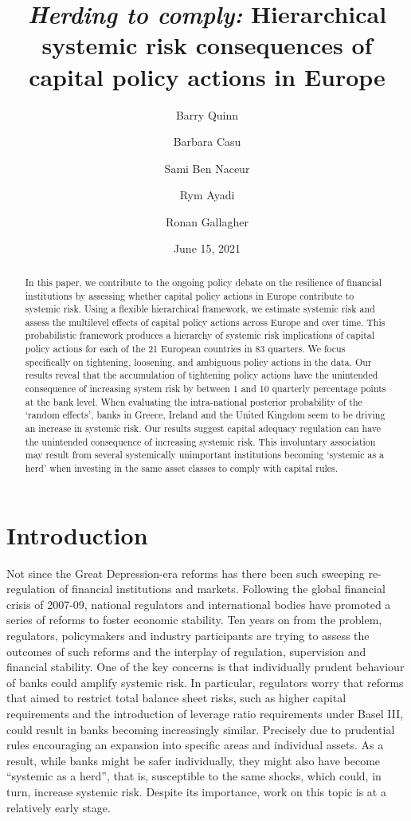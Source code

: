 \documentclass[
  10pt,
]{article}
\title{\emph{Herding to comply:} Hierarchical systemic risk consequences of
capital policy actions in Europe}
\author{Barry Quinn \and Barbara Casu \and Sami Ben Naceur \and Rym Ayadi \and Ronan Gallagher}
\date{June 15, 2021}
\begin{document}
\maketitle
\begin{abstract}
In this paper, we contribute to the ongoing policy debate on the
resilience of financial institutions by assessing whether capital policy
actions in Europe contribute to systemic risk. Using a flexible
hierarchical framework, we estimate systemic risk and assess the
multilevel effects of capital policy actions across Europe and over
time. This probabilistic framework produces a hierarchy of systemic risk
implications of capital policy actions for each of the 21 European
countries in 83 quarters. We focus specifically on tightening,
loosening, and ambiguous policy actions in the data. Our results reveal
that the accumulation of tightening policy actions have the unintended
consequence of increasing system risk by between 1 and 10 quarterly
percentage points at the bank level. When evaluating the intra-national
posterior probability of the `random effects', banks in Greece, Ireland
and the United Kingdom seem to be driving an increase in systemic risk.
Our results suggest capital adequacy regulation can have the unintended
consequence of increasing systemic risk. This involuntary association
may result from several systemically unimportant institutions becoming
`systemic as a herd' when investing in the same asset classes to comply
with capital rules.
\end{abstract}

\hypertarget{introduction}{%
\section{Introduction}\label{introduction}}

Not since the Great Depression-era reforms has there been such sweeping
re-regulation of financial institutions and markets. Following the
global financial crisis of 2007-09, national regulators and
international bodies have promoted a series of reforms to foster
economic stability. Ten years on from the problem, regulators,
policymakers and industry participants are trying to assess the outcomes
of such reforms and the interplay of regulation, supervision and
financial stability. One of the key concerns is that individually
prudent behaviour of banks could amplify systemic risk. In particular,
regulators worry that reforms that aimed to restrict total balance sheet
risks, such as higher capital requirements and the introduction of
leverage ratio requirements under Basel III, could result in banks
becoming increasingly similar. Precisely due to prudential rules
encouraging an expansion into specific areas and individual assets. As a
result, while banks might be safer individually, they might also have
become ``systemic as a herd'', that is, susceptible to the same shocks,
which could, in turn, increase systemic risk. Despite its importance,
work on this topic is at a relatively early stage.
\end{document}
